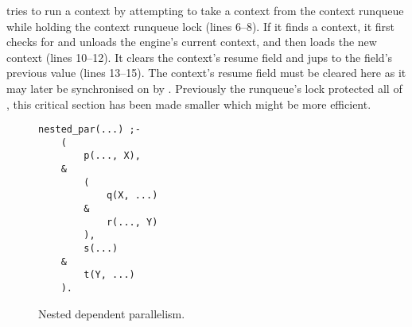 \idle tries to run a context by  attempting to take a context from the
context runqueue while holding the context runqueue lock (lines 6--8).
If it finds a context,
it first checks for and unloads the engine's current context,
and then loads the new context (lines 10--12).
It clears the context's resume field and jups to the field's previous value
(lines 13--15).
The context's resume field must be cleared here as it may later be
synchronised on by \joinandcontinue.
Previously the runqueue's lock protected all of \idle,
this critical section has been made smaller which might be more efficient.

\begin{figure}
\begin{center}
\begin{verbatim}
nested_par(...) ;-
    (
        p(..., X),
    &
        (
            q(X, ...)
        & 
            r(..., Y)
        ),
        s(...)
    &
        t(Y, ...)
    ).
\end{verbatim}
\end{center}
\caption{Nested dependent parallelism.}
\label{fig:nested_dep_par}
\end{figure}

